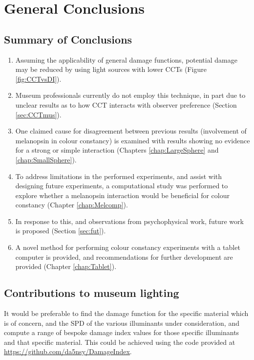 \chapter{General Conclusions}
\label{chap:Conclusions}

\section{Summary of Conclusions}

\begin{enumerate}
\item Assuming the applicability of general damage functions, potential damage may be reduced by using light sources with lower \glspl{CCT} (Figure \ref{fig:CCTvsDI}).
\item Museum professionals currently do not employ this technique, in part due to unclear results as to how \gls{CCT} interacts with observer preference (Section \ref{sec:CCTmus}).
\item One claimed cause for disagreement between previous results (involvement of melanopsin in colour constancy) is examined with results showing no evidence for a strong or simple interaction (Chapters \ref{chap:LargeSphere} and \ref{chap:SmallSphere}).
\item To address limitations in the performed experiments, and assist with designing future experiments, a computational study was performed to explore whether a melanopsin interaction would be beneficial for colour constancy (Chapter \ref{chap:Melcomp}).
\item In response to this, and observations from psychophysical work, future work is proposed (Section \ref{sec:fut}).
\item A novel method for performing colour constancy experiments with a tablet computer is provided, and recommendations for further development are provided (Chapter \ref{chap:Tablet}).
\end{enumerate}

\section{Contributions to museum lighting}

It would be preferable to find the damage function for the specific material which is of concern, and the \gls{SPD} of the various illuminants under consideration, and compute a range of bespoke damage index values for those specific illuminants and that specific material. This could be achieved using the code provided at \url{https://github.com/da5nsy/DamageIndex}.

